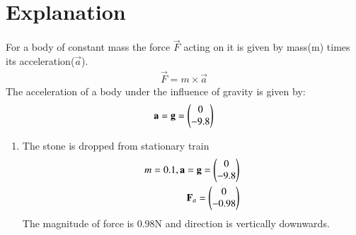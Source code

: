 \documentclass[journal,12pt,twocolumn]{IEEEtran}
\begin{document}
\section{Explanation}
For a body of constant mass the force $\vec{F}$ acting on it is given by mass(m) times its acceleration($\vec{a}$).
\begin{align}
    \vec{F}=m\times\vec{a}
\end{align}
The acceleration of a body under the influence of gravity is given by:
\begin{align}
    \mathbf{a}=\mathbf{g}=\begin{pmatrix}0\\-9.8\end{pmatrix}
\end{align}
\begin{enumerate}[label=(\alph*)]
    \item The stone is dropped from stationary train
    \begin{align}
        m=0.1,
        \mathbf{a}=\mathbf{g}=\begin{pmatrix}0\\-9.8\end{pmatrix}\\
        \mathbf{F}_{a}=\begin{pmatrix}0\\-0.98\end{pmatrix}\\
        \end{align}
   The magnitude of force is 0.98N and direction is vertically downwards. 
   

\end{enumerate}
\end{document}
